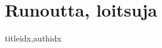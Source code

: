 \documentclass[twoside,10pt,finnish]{book}
\renewcommand{\lyricfont}{\sffamily\Large} %
\begin{document}
    \section{Runoutta, loitsuja}
      \begin{songs}{titleidx,authidx}
        \setcounter{songnum}{470}
        \chordsoff %
        \renewcommand{\lyricfont}{\sffamily\small} %
        
        \renewcommand{\lyricfont}{\sffamily\Large} %
        \chordson
      \end{songs}

  
  \clearpage
\end{document}
